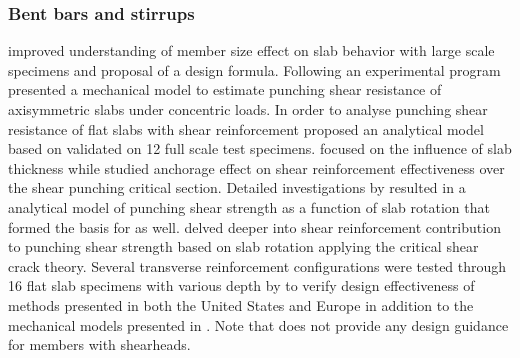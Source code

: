 \subsubsection{Bent bars and stirrups}
\cite{bavzant1987size} improved understanding of member size effect on slab behavior with large scale specimens and proposal of a design formula. Following an experimental program \cite{shehata1989punching} presented a mechanical model to estimate punching shear resistance of axisymmetric slabs under concentric loads.  In order to analyse punching shear resistance of flat slabs with shear reinforcement \cite{gomes1999} proposed an analytical model based on \cite{kinnunen1960,shehata1989punching} validated on 12 full scale test specimens. \cite{birkle2008} focused on the influence of slab thickness while \cite{beutel2002} studied anchorage effect on shear reinforcement effectiveness over the shear punching critical section. Detailed investigations by \cite{guandalini2009punching,muttoni2008punching} resulted in a analytical model of punching shear strength as a function of slab rotation that formed the basis for \cite{mc2010} as well. \cite{ruiz2009} delved deeper into shear reinforcement contribution to punching shear strength based on slab rotation applying the critical shear crack theory. Several transverse reinforcement configurations were tested through 16 flat slab specimens with various depth by \cite{lips2012} to verify design effectiveness of methods presented in both the United States and Europe \cite{ACI-318M2014,en1992} in addition to the mechanical models presented in \cite{muttoni2008punching,ruiz2009}. Note that \cite{en1992} does not provide any design guidance for members with shearheads. 
